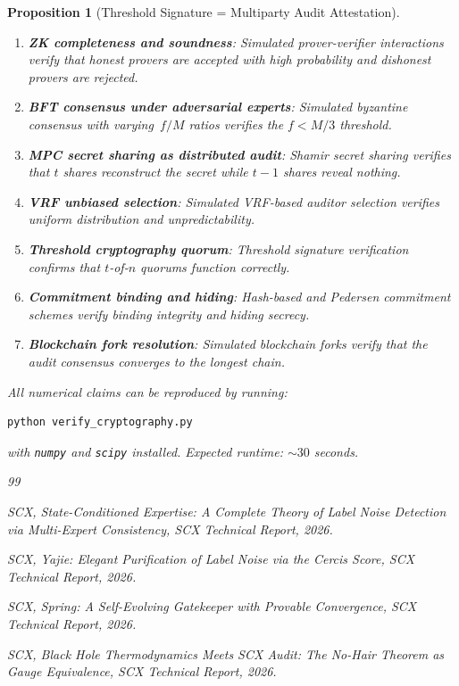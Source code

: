 \documentclass[12pt,a4paper]{article}
\newtheorem{proposition}[theorem]{Proposition}
\theoremstyle{remark}
\begin{document}
\begin{proposition}[Threshold Signature = Multiparty Audit Attestation]
\begin{enumerate}[leftmargin=*, label=(\arabic*)]
  \item \textbf{ZK completeness and soundness}: Simulated prover-verifier interactions verify that honest provers are accepted with high probability and dishonest provers are rejected.
  \item \textbf{BFT consensus under adversarial experts}: Simulated byzantine consensus with varying~$f/M$ ratios verifies the $f < M/3$ threshold.
  \item \textbf{MPC secret sharing as distributed audit}: Shamir secret sharing verifies that $t$ shares reconstruct the secret while $t-1$ shares reveal nothing.
  \item \textbf{VRF unbiased selection}: Simulated VRF-based auditor selection verifies uniform distribution and unpredictability.
  \item \textbf{Threshold cryptography quorum}: Threshold signature verification confirms that $t$-of-$n$ quorums function correctly.
  \item \textbf{Commitment binding and hiding}: Hash-based and Pedersen commitment schemes verify binding integrity and hiding secrecy.
  \item \textbf{Blockchain fork resolution}: Simulated blockchain forks verify that the audit consensus converges to the longest chain.
\end{enumerate}

All numerical claims can be reproduced by running:
\begin{verbatim}
python verify_cryptography.py
\end{verbatim}
with \texttt{numpy} and \texttt{scipy} installed. Expected runtime: $\sim 30$ seconds.


\begin{thebibliography}{99}

SCX,
\emph{State-Conditioned Expertise: A Complete Theory of Label Noise Detection via Multi-Expert Consistency},
SCX Technical Report, 2026.

SCX,
\emph{Yajie: Elegant Purification of Label Noise via the Cercis Score},
SCX Technical Report, 2026.

SCX,
\emph{Spring: A Self-Evolving Gatekeeper with Provable Convergence},
SCX Technical Report, 2026.

SCX,
\emph{Black Hole Thermodynamics Meets SCX Audit: The No-Hair Theorem as Gauge Equivalence},
SCX Technical Report, 2026.


\end{thebibliography}
\end{proposition}
\end{document}
